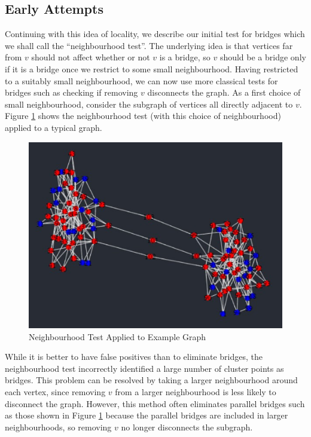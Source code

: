 \documentclass[12pt,a4paper]{amsart}
\numberwithin{equation}{section}
\theoremstyle{plain}
\theoremstyle{definition}
\begin{document}
\subsection*{Early Attempts}

Continuing with this idea of locality, we describe our initial test for bridges which we shall call the ``neighbourhood test''. The underlying idea is that vertices far from $v$ should not affect whether or not $v$ is a bridge, so $v$ should be a bridge only if it is a bridge once we restrict to some small neighbourhood. Having restricted to a suitably small neighbourhood, we can now use more classical tests for bridges such as checking if removing $v$ disconnects the graph. As a first choice of small neighbourhood, consider the subgraph of vertices all directly adjacent to $v$. Figure \ref{nbhdTest} shows the neighbourhood test (with this choice of neighbourhood) applied to a typical graph.

\begin{figure}[h]
	\centering
	\includegraphics[scale=0.6]{NeighbourhoodTest.jpg}
	\caption{Neighbourhood Test Applied to Example Graph}
	\label{nbhdTest}
\end{figure}

While it is better to have false positives than to eliminate bridges, the neighbourhood test incorrectly identified a large number of cluster points as bridges. This problem can be resolved by taking a larger neighbourhood around each vertex, since removing $v$ from a larger neighbourhood is less likely to disconnect the graph. However, this method often eliminates parallel bridges such as those shown in Figure \ref{nbhdTest} because the parallel bridges are included in larger neighbourhoods, so removing $v$ no longer disconnects the subgraph.
\end{document}
